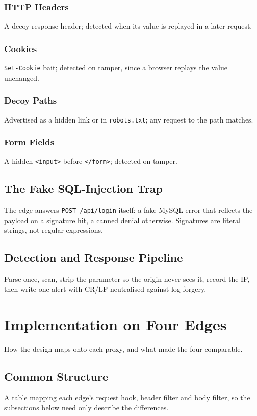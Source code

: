 \documentclass{rptuma}
\begin{document}
\subsection{HTTP Headers}
A decoy response header; detected when its value is replayed in a later request.
\subsection{Cookies}
\texttt{Set-Cookie} bait; detected on tamper, since a browser replays the value unchanged.
\subsection{Decoy Paths}
Advertised as a hidden link or in \texttt{robots.txt}; any request to the path matches.
\subsection{Form Fields}
A hidden \texttt{<input>} before \texttt{</form>}; detected on tamper.

\section{The Fake SQL-Injection Trap}
The edge answers \texttt{POST /api/login} itself: a fake MySQL error that reflects the payload on a
signature hit, a canned denial otherwise. Signatures are literal strings, not regular expressions.

\section{Detection and Response Pipeline}
Parse once, scan, strip the parameter so the origin never sees it, record the IP, then write one
alert with CR/LF neutralised against log forgery.

\chapter{Implementation on Four Edges}
How the design maps onto each proxy, and what made the four comparable.

\section{Common Structure}
A table mapping each edge's request hook, header filter and body filter, so the subsections below
need only describe the differences.
\end{document}
